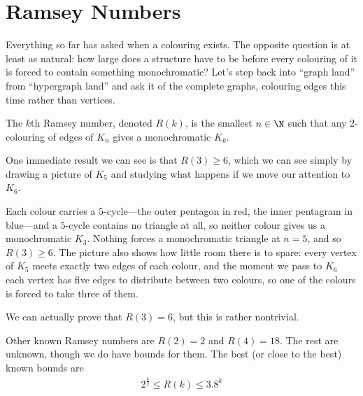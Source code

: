 \section{Ramsey Numbers}

Everything so far has asked when a colouring exists. The opposite question is at least as natural: how large does a structure have to be before every colouring of it is forced to contain something monochromatic? Let's step back into ``graph land'' from ``hypergraph land'' and ask it of the complete graphs, colouring edges this time rather than vertices.

\begin{boxdefinition}
    The $k$th Ramsey number, denoted $R(k)$, is the smallest $n \in \N$ such that any $2$-colouring of edges of $K_n$ gives a monochromatic $K_k$.
\end{boxdefinition}

One immediate result we can see is that $R(3) \geq 6$, which we can see simply by drawing a picture of $K_5$ and studying what happens if we move our attention to $K_6$.

\begin{figure}[H]
    \centering
\end{figure}

Each colour carries a $5$-cycle---the outer pentagon in red, the inner pentagram in blue---and a $5$-cycle contains no triangle at all, so neither colour gives us a monochromatic $K_3$. Nothing forces a monochromatic triangle at $n = 5$, and so $R(3) \geq 6$. The picture also shows how little room there is to spare: every vertex of $K_5$ meets exactly two edges of each colour, and the moment we pass to $K_6$ each vertex has five edges to distribute between two colours, so one of the colours is forced to take three of them.

We can actually prove that $R(3) = 6$, but this is rather nontrivial.

Other known Ramsey numbers are $R(2) = 2$ and $R(4) = 18$. The rest are unknown, though we do have bounds for them. The best (or close to the best) known bounds are
\begin{align*}
    2^{\frac{k}{2}} \leq R(k) \leq 3.8^k
\end{align*}

